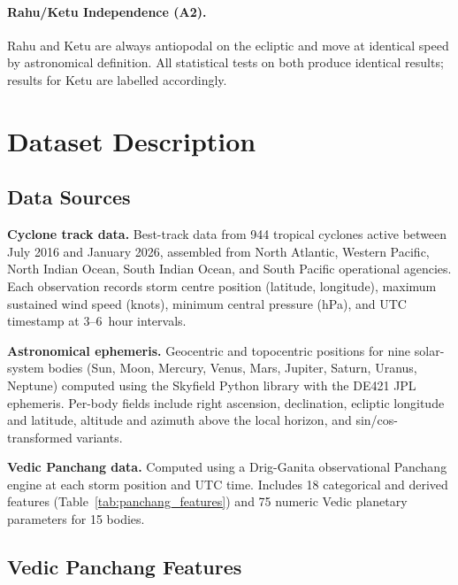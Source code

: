 \documentclass[12pt,a4paper]{article}
\begin{document}
    \paragraph{Rahu/Ketu Independence (A2).} Rahu and Ketu are always
    antiopodal on the ecliptic and move at identical speed by astronomical
    definition. All statistical tests on both produce identical results; results
    for Ketu are labelled accordingly.

    \section{Dataset Description}
    \label{sec:data}

    \subsection{Data Sources}

    \textbf{Cyclone track data.} Best-track data from 944 tropical cyclones
    active between July 2016 and January 2026, assembled from North Atlantic,
    Western Pacific, North Indian Ocean, South Indian Ocean, and South Pacific
    operational agencies. Each observation records storm centre position (latitude,
    longitude), maximum sustained wind speed (knots), minimum central pressure
    (hPa), and UTC timestamp at 3--6~hour intervals.

    \textbf{Astronomical ephemeris.} Geocentric and topocentric positions for
    nine solar-system bodies (Sun, Moon, Mercury, Venus, Mars, Jupiter, Saturn,
    Uranus, Neptune) computed using the Skyfield Python library \cite{skyfield2019}
    with the DE421 JPL ephemeris. Per-body fields include right ascension,
    declination, ecliptic longitude and latitude, altitude and azimuth above the
    local horizon, and sin/cos-transformed variants.

    \textbf{Vedic Panchang data.} Computed using a Drig-Ganita observational
    Panchang engine at each storm position and UTC time. Includes 18 categorical
    and derived features (Table~\ref{tab:panchang_features}) and 75 numeric Vedic
    planetary parameters for 15 bodies.

    \subsection{Vedic Panchang Features}
\end{document}
